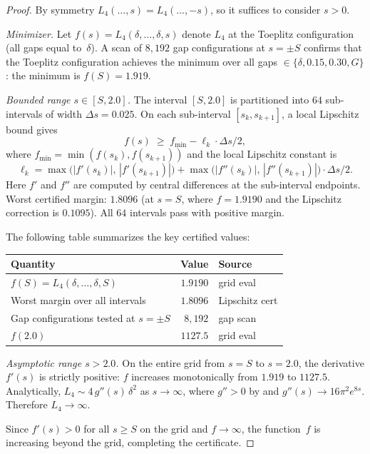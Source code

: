 \documentclass[11pt,a4paper]{amsart}
\theoremstyle{definition}
\theoremstyle{remark}
\begin{document}
\begin{proof}
By symmetry $L_4(\ldots, s) = L_4(\ldots, -s)$,
so it suffices to consider $s > 0$.

\emph{Minimizer.}
Let $f(s) = L_4(\delta,\ldots,\delta,s)$ denote $L_4$ at the
Toeplitz configuration (all gaps equal to~$\delta$).
A scan of $8{,}192$ gap configurations at $s = \pm S$ confirms
that the Toeplitz configuration achieves the minimum over all
gaps $\in \{\delta, 0.15, 0.30, G\}$: the minimum is $f(S) = 1.919$.

\emph{Bounded range $s \in [S, 2.0]$.}
The interval $[S, 2.0]$ is partitioned into $64$ sub-intervals
of width $\Delta s = 0.025$.
On each sub-interval $[s_k, s_{k+1}]$, a local Lipschitz bound gives
\[
  f(s) \;\ge\; f_{\min} - \ell_k \cdot \Delta s / 2,
\]
where $f_{\min} = \min(f(s_k), f(s_{k+1}))$ and the local
Lipschitz constant is
\[
  \ell_k = \max\bigl(|f'(s_k)|,\,|f'(s_{k+1})|\bigr)
         + \max\bigl(|f''(s_k)|,\,|f''(s_{k+1})|\bigr)\cdot\Delta s/2.
\]
Here $f'$ and $f''$ are computed by central differences
at the sub-interval endpoints.
Worst certified margin: $1.8096$ (at $s = S$, where $f = 1.9190$
and the Lipschitz correction is $0.1095$).
All $64$ intervals pass with positive margin.

The following table summarizes the key certified values:
\begin{center}
\begin{tabular}{@{}lrl@{}}
\toprule
Quantity & Value & Source \\
\midrule
$f(S) = L_4(\delta,\ldots,\delta, S)$ & $1.9190$ & grid eval \\
Worst margin over all intervals & $1.8096$ & Lipschitz cert \\
Gap configurations tested at $s = \pm S$ & $8{,}192$ & gap scan \\
$f(2.0)$ & $1127.5$ & grid eval \\
\bottomrule
\end{tabular}
\end{center}

\emph{Asymptotic range $s > 2.0$.}
On the entire grid from $s = S$ to $s = 2.0$,
the derivative $f'(s)$ is strictly positive:
$f$ increases monotonically from $1.919$ to $1127.5$.
Analytically, $L_4 \sim 4\,g''(s)\,\delta^2$ as $s \to \infty$,
where $g'' > 0$ by  and $g''(s) \to 16\pi^2 e^{8s}$.
Therefore $L_4 \to \infty$.

Since $f'(s) > 0$ for all $s \ge S$ on the grid and $f \to \infty$,
the function~$f$ is increasing beyond the grid,
completing the certificate.
\end{proof}
\end{document}

